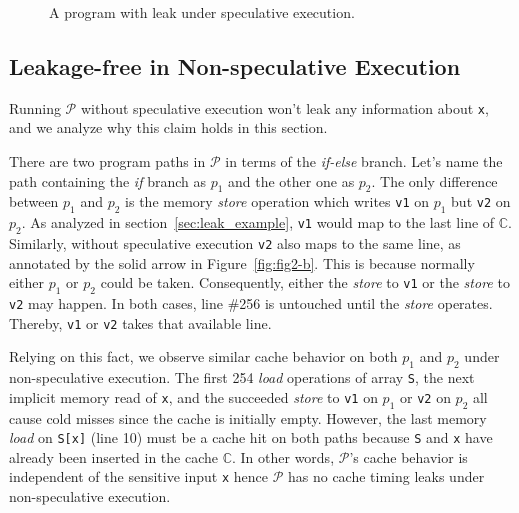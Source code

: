 \documentclass[sigconf]{acmart}
\newcommand{\prog}{\mathcal{P}}
\begin{document}
\begin{figure}
{\begin{minipage}{0.3\linewidth}
\end{minipage}
}
\vspace{-3ex}
\caption{A program with leak under speculative execution.}
\label{fig:motiv}
\end{figure}


\subsection{Leakage-free in Non-speculative Execution}
\label{sec:normal_exec}

Running $\prog$ without speculative execution won't leak any information 
about \texttt{x}, and we analyze why this claim holds in this section. 

There are two program paths in $\prog$ in terms of the \textit{if-else} 
branch. Let's name the path containing the \textit{if} branch as $p_1$ 
and the other one as $p_2$. 
The only difference between $p_1$ and $p_2$ 
is the memory \emph{store} operation which writes \texttt{v1} on $p_1$ 
but \texttt{v2} on $p_2$. As analyzed in section~\ref{sec:leak_example}, 
\texttt{v1} would map to the last line of $\mathbb{C}$. Similarly, without 
speculative execution \texttt{v2} also maps to the same line, as annotated 
by the solid arrow in Figure~\ref{fig:fig2-b}. This is because normally 
either $p_1$ or $p_2$ could be taken. Consequently, either the \textit{store} 
to \texttt{v1} or the \textit{store} to \texttt{v2} may happen. In both 
cases, line \#256 is untouched until the \textit{store} operates. 
Thereby, \texttt{v1} or \texttt{v2} takes that available line.


Relying on this fact, we observe similar cache behavior on both $p_1$ and 
$p_2$ under non-speculative execution. 
%
The first 254 \emph{load} operations 
of array \texttt{S}, the next implicit memory read of \texttt{x}, and the 
succeeded \textit{store} to \texttt{v1} on $p_1$ or \texttt{v2} on $p_2$ 
all cause cold misses since the cache is initially empty. However, the last 
memory \emph{load} on \texttt{S[x]} (line 10) must be a cache hit on both 
paths because \texttt{S} and \texttt{x} have already been inserted in the cache 
$\mathbb{C}$. In other words, $\prog$'s cache behavior is independent of 
the sensitive input \texttt{x} hence $\prog$ has no cache timing leaks 
under non-speculative execution.
\end{document}
